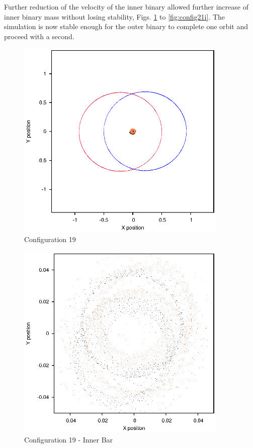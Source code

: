 \documentclass[a4paper,12pt]{article}
\begin{document}
Further reduction of the velocity of the inner binary allowed further increase of inner binary mass without losing stability, Figs. \ref{fig:config19} to \ref{fig:config21i}. The simulation is
now stable enough for the outer binary to complete one orbit and proceed with a second.
\begin{figure}[H]
\centering
\includegraphics[width=0.9\textwidth]{./2017results/06-8-06-25/Orbit.eps}
\caption{Configuration 19}
\label{fig:config19}
\end{figure}
\begin{figure}[H]
\centering
\includegraphics[width=0.9\textwidth]{./2017results/06-8-06-25/Inner.eps}
\caption{Configuration 19 - Inner Bar}
\label{fig:config19i}
\end{figure}
\end{document}
